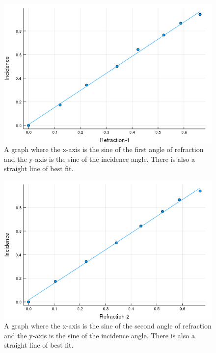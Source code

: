 \documentclass[12pt]{article}
\begin{document}
\begin{figure}[H]
  \label{gph:exp4ref1}
  \begin{center}
    \includegraphics[scale=0.6]{exp4-ref1.png}
  \end{center}
  \caption{A graph where the x-axis is the sine of the first angle of refraction
    and the y-axis is the sine of the incidence angle. There is also a straight
    line of best fit.}
\end{figure}

\begin{figure}[H]
  \label{gph:exp4ref2}
  \begin{center}
    \includegraphics[scale=0.6]{exp4-ref2.png}
  \end{center}
  \caption{A graph where the x-axis is the sine of the second angle of refraction
    and the y-axis is the sine of the incidence angle. There is also a straight
    line of best fit.}
\end{figure}
\end{document}
